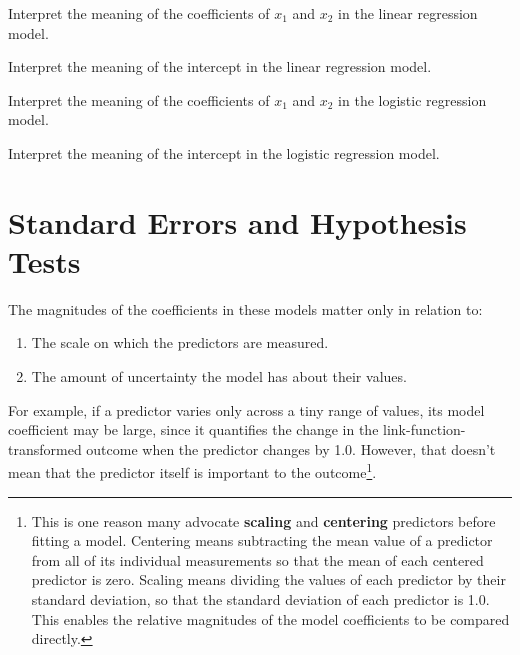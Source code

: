 \begin{question}{}
Interpret the meaning of the coefficients of $x_1$ and $x_2$ in the linear regression model.
\end{question}

\begin{question}{}
Interpret the meaning of the intercept in the linear regression model.
\end{question}

\begin{question}{}
Interpret the meaning of the coefficients of $x_1$ and $x_2$ in the logistic regression model.
\end{question}

\begin{question}{}
Interpret the meaning of the intercept in the logistic regression model.
\end{question}


\section{Standard Errors and Hypothesis Tests}

The magnitudes of the coefficients in these models matter only in relation to:
\begin{enumerate}
\item The scale on which the predictors are measured. 
\item The amount of uncertainty the model has about their values.
\end{enumerate}
For example, if a predictor varies only across a tiny range of values, its model coefficient may be large, since it quantifies the change in the link-function-transformed outcome when the predictor changes by 1.0. However, that doesn't mean that the predictor itself is important to the outcome\footnote{This is one reason many advocate \textbf{scaling} and \textbf{centering} predictors before fitting a model. Centering means subtracting the mean value of a predictor from all of its individual measurements so that the mean of each centered predictor is zero. Scaling means dividing the values of each predictor by their standard deviation, so that the standard deviation of each predictor is 1.0. This enables the relative magnitudes of the model coefficients to be compared directly.}.

